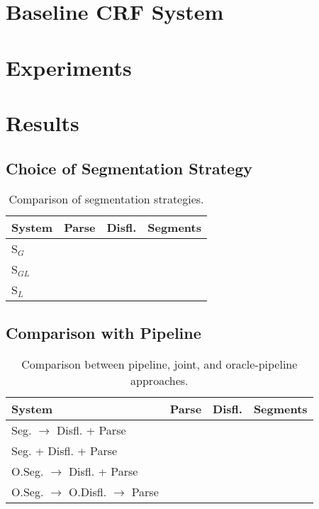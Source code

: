 \documentclass[11pt,letterpaper]{article}
\begin{document}
\clearpage
\section{Baseline CRF System}

\section{Experiments}

\section{Results}

\subsection{Choice of Segmentation Strategy}

\begin{table}
    \centering
    \small
    \begin{tabular}{l|rrr}
        System & Parse & Disfl. & Segments \\
        \hline \hline
        S$_G$ & & & \\
        S$_{GL}$  & & & \\
        S$_L$  & & & \\
        \hline
    \end{tabular}
    \caption{\small Comparison of segmentation strategies.}
\end{table}


\subsection{Comparison with Pipeline}

\begin{table}
    \centering
    \small
    \begin{tabular}{l|rrr}
        System & Parse & Disfl. & Segments \\
        \hline \hline
        Seg. $\rightarrow$ Disfl. + Parse & & & \\
        Seg. + Disfl. + Parse  & & & \\
        \hline
        O.Seg. $\rightarrow$ Disfl. + Parse & & & \\
        O.Seg. $\rightarrow$ O.Disfl. $\rightarrow$ Parse & & & \\
        \hline

    \end{tabular}
    \caption{\small Comparison between pipeline, joint, and oracle-pipeline
             approaches.}
\end{table}
\end{document}
